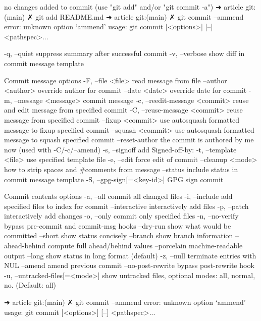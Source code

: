 no changes added to commit (use "git add" and/or "git commit -a")
➜  article git:(main) ✗ git add README.md 
➜  article git:(main) ✗ git commit --ammend
error: unknown option `ammend'
usage: git commit [<options>] [--] <pathspec>...

    -q, --quiet           suppress summary after successful commit
    -v, --verbose         show diff in commit message template

Commit message options
    -F, --file <file>     read message from file
    --author <author>     override author for commit
    --date <date>         override date for commit
    -m, --message <message>
                          commit message
    -c, --reedit-message <commit>
                          reuse and edit message from specified commit
    -C, --reuse-message <commit>
                          reuse message from specified commit
    --fixup <commit>      use autosquash formatted message to fixup specified commit
    --squash <commit>     use autosquash formatted message to squash specified commit
    --reset-author        the commit is authored by me now (used with -C/-c/--amend)
    -s, --signoff         add Signed-off-by:
    -t, --template <file>
                          use specified template file
    -e, --edit            force edit of commit
    --cleanup <mode>      how to strip spaces and #comments from message
    --status              include status in commit message template
    -S, --gpg-sign[=<key-id>]
                          GPG sign commit

Commit contents options
    -a, --all             commit all changed files
    -i, --include         add specified files to index for commit
    --interactive         interactively add files
    -p, --patch           interactively add changes
    -o, --only            commit only specified files
    -n, --no-verify       bypass pre-commit and commit-msg hooks
    --dry-run             show what would be committed
    --short               show status concisely
    --branch              show branch information
    --ahead-behind        compute full ahead/behind values
    --porcelain           machine-readable output
    --long                show status in long format (default)
    -z, --null            terminate entries with NUL
    --amend               amend previous commit
    --no-post-rewrite     bypass post-rewrite hook
    -u, --untracked-files[=<mode>]
                          show untracked files, optional modes: all, normal, no. (Default: all)

➜  article git:(main) ✗ git commit --ammend
error: unknown option `ammend'
usage: git commit [<options>] [--] <pathspec>...

